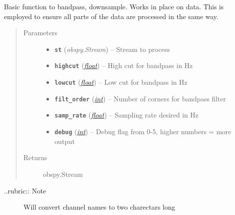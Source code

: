 \documentclass[a4paper,10pt,english]{sphinxmanual}
\begin{document}

\begin{fulllineitems}
\label{submodules/utils.pre_processing:pre_processing.shortproc}
Basic function to bandpass, downsample.  Works in place
on data.  This is employed to ensure all parts of the data are processed
in the same way.
\begin{quote}\begin{description}
\item[{Parameters}] \leavevmode\begin{itemize}
\item {} 
\textbf{\texttt{st}} (\emph{obspy.Stream}) -- Stream to process

\item {} 
\textbf{\texttt{highcut}} (\href{https://docs.python.org/library/functions.html\#float}{\emph{float}}) -- High cut for bandpass in Hz

\item {} 
\textbf{\texttt{lowcut}} (\href{https://docs.python.org/library/functions.html\#float}{\emph{float}}) -- Low cut for bandpass in Hz

\item {} 
\textbf{\texttt{filt\_order}} (\href{https://docs.python.org/library/functions.html\#int}{\emph{int}}) -- Number of corners for bandpass filter

\item {} 
\textbf{\texttt{samp\_rate}} (\href{https://docs.python.org/library/functions.html\#float}{\emph{float}}) -- Sampling rate desired in Hz

\item {} 
\textbf{\texttt{debug}} (\href{https://docs.python.org/library/functions.html\#int}{\emph{int}}) -- Debug flag from 0-5, higher numbers = more output

\end{itemize}

\item[{Returns}] \leavevmode
obspy.Stream

\end{description}\end{quote}
\begin{description}
\item[{..rubric:: Note}] \leavevmode
Will convert channel names to two charectars long

\end{description}

\end{fulllineitems}
\end{document}
